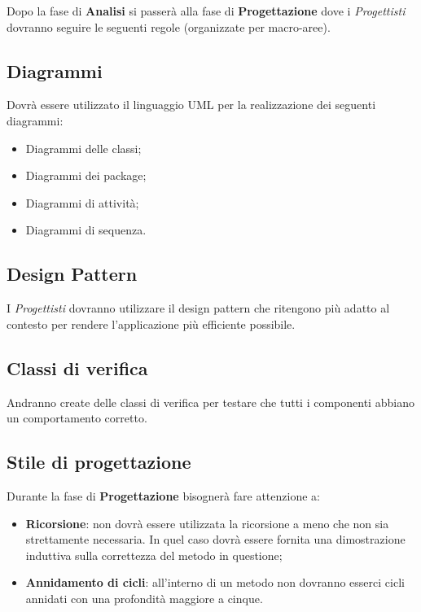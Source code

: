 Dopo la fase di \textbf{Analisi} si passerà alla fase di \textbf{Progettazione} dove i \textit{Progettisti} dovranno seguire le seguenti regole (organizzate per macro-aree).\\

\subsection{Diagrammi}

Dovrà essere utilizzato il linguaggio UML per la realizzazione dei seguenti diagrammi:

\begin{itemize}
	\item Diagrammi delle classi;
	\item Diagrammi dei package;
	\item Diagrammi di attività;
	\item Diagrammi di sequenza.
\end{itemize}

\subsection{Design Pattern}

I \textit{Progettisti} dovranno utilizzare il design pattern che ritengono più adatto al contesto per rendere l'applicazione più efficiente possibile.

\subsection{Classi di verifica}

Andranno create delle classi di verifica per testare che tutti i componenti abbiano un comportamento corretto.

\subsection{Stile di progettazione}

Durante la fase di \textbf{Progettazione} bisognerà fare attenzione a:

\begin{itemize}
\item \textbf{Ricorsione}: non dovrà essere utilizzata la ricorsione a meno che non sia strettamente necessaria. In quel caso dovrà essere fornita una dimostrazione induttiva sulla correttezza del metodo in questione;
\item \textbf{Annidamento di cicli}: all'interno di un metodo non dovranno esserci cicli annidati con una profondità maggiore a cinque.
\end{itemize}